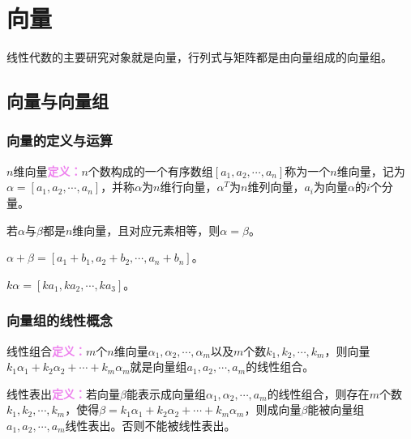 \setcounter{tocdepth}{4}
\setcounter{secnumdepth}{4}
\renewcommand{\baselinestretch}{1.5}
\chapter{向量}

线性代数的主要研究对象就是向量，行列式与矩阵都是由向量组成的向量组。

\section{向量与向量组}

\subsection{向量的定义与运算}

$n$维向量\textcolor{violet}{\textbf{定义：}}$n$个数构成的一个有序数组$[a_1,a_2,\cdots,a_n]$称为一个$n$维向量，记为$\alpha=[a_1,a_2,\cdots,a_n]$，并称$\alpha$为$n$维行向量，$\alpha^T$为$n$维列向量，$a_i$为向量$\alpha$的$i$个分量。

若$\alpha$与$\beta$都是$n$维向量，且对应元素相等，则$\alpha=\beta$。

$\alpha+\beta=[a_1+b_1,a_2+b_2,\cdots,a_n+b_n]$。

$k\alpha=[ka_1,ka_2,\cdots,ka_3]$。

\subsection{向量组的线性概念}

线性组合\textcolor{violet}{\textbf{定义：}}$m$个$n$维向量$\alpha_1,\alpha_2,\cdots,\alpha_m$以及$m$个数$k_1,k_2,\cdots,k_m$，则向量$k_1\alpha_1+k_2\alpha_2+\cdots+k_m\alpha_m$就是向量组$a_1,a_2,\cdots,a_m$的线性组合。

线性表出\textcolor{violet}{\textbf{定义：}}若向量$\beta$能表示成向量组$\alpha_1,\alpha_2,\cdots,a_m$的线性组合，则存在$m$个数$k_1,k_2,\cdots,k_m$，使得$\beta=k_1\alpha_1+k_2\alpha_2+\cdots+k_m\alpha_m$，则成向量$\beta$能被向量组$a_1,a_2,\cdots,a_m$线性表出。否则不能被线性表出。

